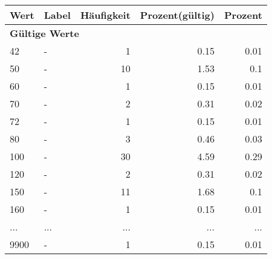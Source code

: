      \begin{longtable}{lXrrr}
     \toprule
     \textbf{Wert} & \textbf{Label} & \textbf{Häufigkeit} & \textbf{Prozent(gültig)} & \textbf{Prozent} \\
     \endhead
     \midrule
     \multicolumn{5}{l}{\textbf{Gültige Werte}}\\
        42 & \multicolumn{1}{X}{-} & %
          \num{1} &
          \num[round-mode=places,round-precision=2]{0.15} &
          \num[round-mode=places,round-precision=2]{0.01} \\
        50 & \multicolumn{1}{X}{-} & %
          \num{10} &
          \num[round-mode=places,round-precision=2]{1.53} &
          \num[round-mode=places,round-precision=2]{0.1} \\
        60 & \multicolumn{1}{X}{-} & %
          \num{1} &
          \num[round-mode=places,round-precision=2]{0.15} &
          \num[round-mode=places,round-precision=2]{0.01} \\
        70 & \multicolumn{1}{X}{-} & %
          \num{2} &
          \num[round-mode=places,round-precision=2]{0.31} &
          \num[round-mode=places,round-precision=2]{0.02} \\
        72 & \multicolumn{1}{X}{-} & %
          \num{1} &
          \num[round-mode=places,round-precision=2]{0.15} &
          \num[round-mode=places,round-precision=2]{0.01} \\
        80 & \multicolumn{1}{X}{-} & %
          \num{3} &
          \num[round-mode=places,round-precision=2]{0.46} &
          \num[round-mode=places,round-precision=2]{0.03} \\
        100 & \multicolumn{1}{X}{-} & %
          \num{30} &
          \num[round-mode=places,round-precision=2]{4.59} &
          \num[round-mode=places,round-precision=2]{0.29} \\
        120 & \multicolumn{1}{X}{-} & %
          \num{2} &
          \num[round-mode=places,round-precision=2]{0.31} &
          \num[round-mode=places,round-precision=2]{0.02} \\
        150 & \multicolumn{1}{X}{-} & %
          \num{11} &
          \num[round-mode=places,round-precision=2]{1.68} &
          \num[round-mode=places,round-precision=2]{0.1} \\
        160 & \multicolumn{1}{X}{-} & %
          \num{1} &
          \num[round-mode=places,round-precision=2]{0.15} &
          \num[round-mode=places,round-precision=2]{0.01} \\
       ... & ... & ... & ... & ... \\
        9900 & \multicolumn{1}{X}{-} & %
          \num{1} &
          \num[round-mode=places,round-precision=2]{0.15} &
          \num[round-mode=places,round-precision=2]{0.01} \\


\end{longtable}
